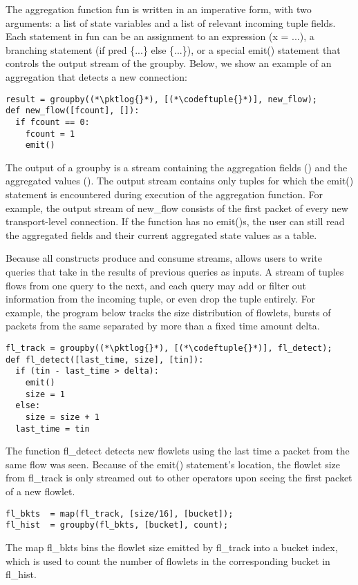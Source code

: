 The aggregation function {\ct fun} is written in an imperative form, with two
arguments: a list of state variables and a list of
relevant incoming tuple fields. Each statement in {\ct fun} can be an
assignment to an expression ({\ct x = ...}), a branching statement ({\ct if pred \{...\} else \{...\}}), or a special {\ct emit()} statement that
controls the output stream of the {\ct groupby}. Below, we show an example of an
aggregation that detects a new connection:
\begin{lstlisting}
result = groupby((*\pktlog{}*), [(*\codeftuple{}*)], new_flow);
def new_flow([fcount], []):
  if fcount == 0:
    fcount = 1
    emit()
\end{lstlisting}
The output of a {\ct groupby} is a stream containing the aggregation fields
(\eg \txtftuple) and the aggregated values (). The output
stream contains only tuples for which the {\ct emit()} statement is encountered
during execution of the aggregation function. For example, the output stream of
{\ct new\_flow} consists of the first packet of every new transport-level
connection. If the function has no {\ct emit()}s, the user can still
read the aggregated fields and their
current aggregated state values as a table.

Because all \TheSystem constructs produce and consume streams, \TheSystem
allows users to write queries that take in the results of previous queries as
inputs. A stream of tuples flows from one query to the next, and each query may
add or filter out information from the incoming tuple, or even drop the tuple
entirely. For example, the program below tracks the size distribution of
flowlets, \ie bursts of packets from the same \txtftuple separated by more than
a fixed time amount {\ct delta}.
\begin{lstlisting}
fl_track = groupby((*\pktlog{}*), [(*\codeftuple{}*)], fl_detect);
def fl_detect([last_time, size], [tin]):
  if (tin - last_time > delta):
    emit()
    size = 1
  else:
    size = size + 1
  last_time = tin
\end{lstlisting}
The function {\ct fl\_detect} detects new flowlets using the last time a
packet from the same flow was seen. Because of the {\ct emit()}
statement's location, the flowlet size from {\ct fl\_track} is only streamed out
to other operators upon seeing the first packet of a new flowlet.
\begin{lstlisting}
fl_bkts  = map(fl_track, [size/16], [bucket]);
fl_hist  = groupby(fl_bkts, [bucket], count);
\end{lstlisting}
The map {\ct fl\_bkts} bins the flowlet size emitted by {\ct fl\_track} into a
bucket index, which is used to count the number of flowlets in the corresponding
bucket in {\ct fl\_hist}.

